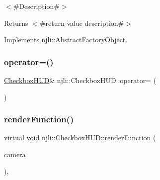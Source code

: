 $<$\#\+Description\#$>$

\begin{DoxyReturn}{Returns}
$<$\#return value description\#$>$ 
\end{DoxyReturn}


Implements \mbox{\hyperlink{classnjli_1_1_abstract_factory_object_a838f4fa7e65cace6098aab5222892942}{njli\+::\+Abstract\+Factory\+Object}}.

\mbox{\label{classnjli_1_1_checkbox_h_u_d_a750ebe87c1e2357b8d434200568420f4}} 
\subsubsection{\texorpdfstring{operator=()}{operator=()}}
{\footnotesize\ttfamily \mbox{\hyperlink{classnjli_1_1_checkbox_h_u_d}{Checkbox\+H\+UD}}\& njli\+::\+Checkbox\+H\+U\+D\+::operator= (\begin{DoxyParamCaption}\item[{const \mbox{\hyperlink{classnjli_1_1_checkbox_h_u_d}{Checkbox\+H\+UD}} \&}]{ }\end{DoxyParamCaption})\hspace{0.3cm}{\ttfamily [protected]}}

\mbox{\label{classnjli_1_1_checkbox_h_u_d_a9a833ae0ac0412333e305dad18a46c6b}} 
\subsubsection{\texorpdfstring{render\+Function()}{renderFunction()}}
{\footnotesize\ttfamily virtual \mbox{\hyperlink{_thread_8h_af1e856da2e658414cb2456cb6f7ebc66}{void}} njli\+::\+Checkbox\+H\+U\+D\+::render\+Function (\begin{DoxyParamCaption}\item[{\mbox{\hyperlink{classnjli_1_1_camera}{Camera}} $\ast$}]{camera }\end{DoxyParamCaption})\hspace{0.3cm}{\ttfamily [protected]}, {\ttfamily [virtual]}}



